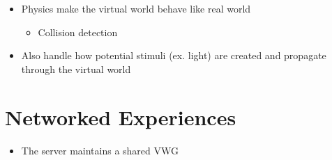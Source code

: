   \begin{itemize}
    \item Physics make the virtual world behave like real world
    \begin{itemize}
      \item Collision detection
    \end{itemize}

    \item Also handle how potential stimuli (ex. light) are created and
    propagate through the virtual world
  \end{itemize}

\section{Networked Experiences}

  \begin{itemize}
    \item The server maintains a shared VWG
  \end{itemize}
